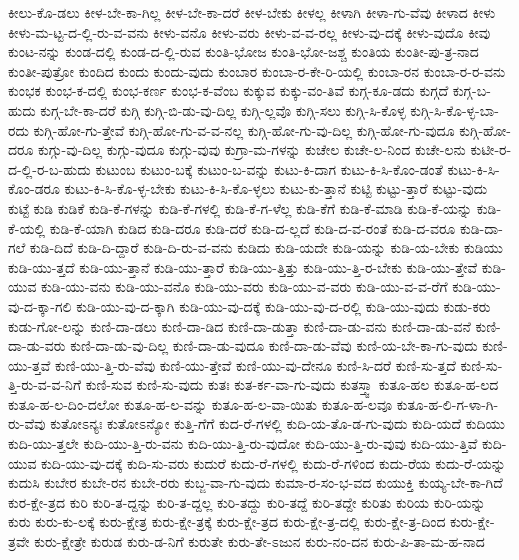 {ಕೀಲು-ಕೊ-ಡಲು
ಕೀಳ-ಬೇ-ಕಾ-ಗಿಲ್ಲ
ಕೀಳ-ಬೇ-ಕಾ-ದರೆ
ಕೀಳ-ಬೇಕು
ಕೀಳಲ್ಲ
ಕೀಳಾಗಿ
ಕೀಳಾ-ಗು-ವೆವು
ಕೀಳಾದ
ಕೀಳು
ಕೀಳು-ಮ-ಟ್ಟ-ದ-ಲ್ಲಿ-ರು-ವ-ವನು
ಕೀಳು-ವನೊ
ಕೀಳು-ವರು
ಕೀಳು-ವ-ವ-ರಲ್ಲ
ಕೀಳು-ವು-ದಕ್ಕೆ
ಕೀಳು-ವುದೊ
ಕೀವು
ಕುಂಟ-ನನ್ನು
ಕುಂಡ-ದಲ್ಲಿ
ಕುಂಡ-ದ-ಲ್ಲಿ-ರುವ
ಕುಂತಿ-ಭೋಜ
ಕುಂತಿ-ಭೋ-ಜಶ್ಚ
ಕುಂತಿಯ
ಕುಂತೀ-ಪು-ತ್ರ-ನಾದ
ಕುಂತೀ-ಪುತ್ರೋ
ಕುಂದಿದ
ಕುಂದು
ಕುಂದು-ವುದು
ಕುಂಬಾರ
ಕುಂಬಾ-ರ-ಕೇ-ರಿ-ಯಲ್ಲಿ
ಕುಂಬಾ-ರನ
ಕುಂಬಾ-ರ-ರ-ವನು
ಕುಂಭಕ
ಕುಂಭ-ಕ-ದಲ್ಲಿ
ಕುಂಭ-ಕರ್ಣ
ಕುಂಭ-ಕ-ವೆಂಬ
ಕುಕ್ಕುವ
ಕುಕ್ಕು-ವಂ-ತಿವೆ
ಕುಗ್ಗ-ಕೂ-ಡದು
ಕುಗ್ಗದೆ
ಕುಗ್ಗ-ಬ-ಹುದು
ಕುಗ್ಗ-ಬೇ-ಕಾ-ದರೆ
ಕುಗ್ಗಿ
ಕುಗ್ಗಿ-ಬಿ-ಡು-ವು-ದಿಲ್ಲ
ಕುಗ್ಗಿ-ಲ್ಲವೊ
ಕುಗ್ಗಿ-ಸಲು
ಕುಗ್ಗಿ-ಸಿ-ಕೊಳ್ಳ
ಕುಗ್ಗಿ-ಸಿ-ಕೊ-ಳ್ಳ-ಬಾ-ರದು
ಕುಗ್ಗಿ-ಹೋ-ಗು-ತ್ತೇವೆ
ಕುಗ್ಗಿ-ಹೋ-ಗು-ವ-ವ-ನಲ್ಲ
ಕುಗ್ಗಿ-ಹೋ-ಗು-ವು-ದಿಲ್ಲ
ಕುಗ್ಗಿ-ಹೋ-ಗು-ವುದೂ
ಕುಗ್ಗಿ-ಹೋ-ದರೂ
ಕುಗ್ಗು-ವು-ದಿಲ್ಲ
ಕುಗ್ಗು-ವುದೂ
ಕುಗ್ಗು-ವುವು
ಕುಗ್ರಾ-ಮ-ಗಳನ್ನು
ಕುಚೇಲ
ಕುಚೇ-ಲ-ನಿಂದ
ಕುಚೇ-ಲನು
ಕುಟೀ-ರ-ದ-ಲ್ಲಿ-ರ-ಬ-ಹುದು
ಕುಟುಂಬ
ಕುಟುಂ-ಬಕ್ಕೆ
ಕುಟುಂ-ಬ-ವನ್ನು
ಕುಟು-ಕಿ-ದಾಗ
ಕುಟು-ಕಿ-ಸಿ-ಕೊಂ-ಡಂತೆ
ಕುಟು-ಕಿ-ಸಿ-ಕೊಂ-ಡರೂ
ಕುಟು-ಕಿ-ಸಿ-ಕೊ-ಳ್ಳ-ಬೇಕು
ಕುಟು-ಕಿ-ಸಿ-ಕೊ-ಳ್ಳಲು
ಕುಟು-ಕು-ತ್ತಾನೆ
ಕುಟ್ಟಿ
ಕುಟ್ಟು-ತ್ತಾರೆ
ಕುಟ್ಟು-ವುದು
ಕುಟ್ಟೆ
ಕುಡಿ
ಕುಡಿಕೆ
ಕುಡಿ-ಕೆ-ಗಳನ್ನು
ಕುಡಿ-ಕೆ-ಗಳಲ್ಲಿ
ಕುಡಿ-ಕೆ-ಗ-ಳೆಲ್ಲ
ಕುಡಿ-ಕೆಗೆ
ಕುಡಿ-ಕೆ-ಮಾಡಿ
ಕುಡಿ-ಕೆ-ಯನ್ನು
ಕುಡಿ-ಕೆ-ಯಲ್ಲಿ
ಕುಡಿ-ಕೆ-ಯಾಗಿ
ಕುಡಿದ
ಕುಡಿ-ದರೂ
ಕುಡಿ-ದರೆ
ಕುಡಿ-ದ-ಲ್ಲದೆ
ಕುಡಿ-ದ-ವ-ರಂತೆ
ಕುಡಿ-ದ-ವರೂ
ಕುಡಿ-ದಾ-ಗಲೆ
ಕುಡಿ-ದಿದೆ
ಕುಡಿ-ದಿ-ದ್ದಾರೆ
ಕುಡಿ-ದಿ-ರು-ವ-ವನು
ಕುಡಿದು
ಕುಡಿ-ಯದೇ
ಕುಡಿ-ಯನ್ನು
ಕುಡಿ-ಯ-ಬೇಕು
ಕುಡಿಯು
ಕುಡಿ-ಯು-ತ್ತದೆ
ಕುಡಿ-ಯು-ತ್ತಾನೆ
ಕುಡಿ-ಯು-ತ್ತಾರೆ
ಕುಡಿ-ಯು-ತ್ತಿತ್ತು
ಕುಡಿ-ಯು-ತ್ತಿ-ರ-ಬೇಕು
ಕುಡಿ-ಯು-ತ್ತೇವೆ
ಕುಡಿ-ಯುವ
ಕುಡಿ-ಯು-ವನು
ಕುಡಿ-ಯು-ವನೊ
ಕುಡಿ-ಯು-ವರು
ಕುಡಿ-ಯು-ವ-ವರು
ಕುಡಿ-ಯು-ವ-ವ-ರೆಗೆ
ಕುಡಿ-ಯು-ವು-ದ-ಕ್ಕಾ-ಗಲಿ
ಕುಡಿ-ಯು-ವು-ದ-ಕ್ಕಾಗಿ
ಕುಡಿ-ಯು-ವು-ದಕ್ಕೆ
ಕುಡಿ-ಯು-ವು-ದ-ರಲ್ಲಿ
ಕುಡಿ-ಯು-ವುದು
ಕುಡು-ಕರು
ಕುಡು-ಗೋ-ಲನ್ನು
ಕುಣಿ-ದಾ-ಡಲು
ಕುಣಿ-ದಾ-ಡಿದ
ಕುಣಿ-ದಾ-ಡುತ್ತಾ
ಕುಣಿ-ದಾ-ಡು-ವನು
ಕುಣಿ-ದಾ-ಡು-ವನೆ
ಕುಣಿ-ದಾ-ಡು-ವರು
ಕುಣಿ-ದಾ-ಡು-ವು-ದಿಲ್ಲ
ಕುಣಿ-ದಾ-ಡು-ವುದೂ
ಕುಣಿ-ದಾ-ಡು-ವೆವು
ಕುಣಿ-ಯ-ಬೇ-ಕಾ-ಗು-ವುದು
ಕುಣಿ-ಯು-ತ್ತವೆ
ಕುಣಿ-ಯು-ತ್ತಿ-ರು-ವೆವು
ಕುಣಿ-ಯು-ತ್ತೇವೆ
ಕುಣಿ-ಯು-ವು-ದೇನೂ
ಕುಣಿ-ಸಿ-ದರೆ
ಕುಣಿ-ಸು-ತ್ತದೆ
ಕುಣಿ-ಸು-ತ್ತಿ-ರು-ವ-ವ-ನಿಗೆ
ಕುಣಿ-ಸುವ
ಕುಣಿ-ಸು-ವುದು
ಕುತಃ
ಕುತ-ರ್ಕ-ವಾ-ಗು-ವುದು
ಕುತಸ್ತ್ವಾ
ಕುತೂ-ಹಲ
ಕುತೂ-ಹ-ಲದ
ಕುತೂ-ಹ-ಲ-ದಿಂ-ದಲೋ
ಕುತೂ-ಹ-ಲ-ವನ್ನು
ಕುತೂ-ಹ-ಲ-ವಾ-ಯಿತು
ಕುತೂ-ಹ-ಲವೂ
ಕುತೂ-ಹ-ಲಿ-ಗ-ಳಾ-ಗಿ-ರು-ವೆವು
ಕುತೋಽನ್ಯಃ
ಕುತೋಽನ್ಯೋ
ಕುತ್ತಿ-ಗೆಗೆ
ಕುದ-ರೆ-ಗಳಲ್ಲಿ
ಕುದಿ-ಯ-ತೊ-ಡ-ಗು-ವುದು
ಕುದಿ-ಯದೆ
ಕುದಿಯು
ಕುದಿ-ಯು-ತ್ತಲೇ
ಕುದಿ-ಯು-ತ್ತಿ-ರು-ವನು
ಕುದಿ-ಯು-ತ್ತಿ-ರು-ವುದೋ
ಕುದಿ-ಯು-ತ್ತಿ-ರು-ವುವು
ಕುದಿ-ಯು-ತ್ತಿವೆ
ಕುದಿ-ಯುವ
ಕುದಿ-ಯು-ವು-ದಕ್ಕೆ
ಕುದಿ-ಸು-ವರು
ಕುದುರೆ
ಕುದು-ರೆ-ಗಳಲ್ಲಿ
ಕುದು-ರೆ-ಗಳಿಂದ
ಕುದು-ರೆಯ
ಕುದು-ರೆ-ಯನ್ನು
ಕುದುಸಿ
ಕುಬೇರ
ಕುಬೇ-ರನ
ಕುಬೇ-ರರು
ಕುಬ್ಜ-ವಾ-ಗು-ವುದು
ಕುಮಾ-ರ-ಸಂ-ಭ-ವದ
ಕುಯುಕ್ತಿ
ಕುಯ್ಯ-ಬೇ-ಕಾ-ಗಿದೆ
ಕುರ-ಕ್ಷೇ-ತ್ರದ
ಕುರಿ
ಕುರಿ-ತ-ದ್ದನ್ನು
ಕುರಿ-ತ-ದ್ದಲ್ಲ
ಕುರಿ-ತದ್ದು
ಕುರಿ-ತದ್ದೆ
ಕುರಿ-ತದ್ದೇ
ಕುರಿತು
ಕುರಿಯ
ಕುರಿ-ಯನ್ನು
ಕುರು
ಕುರು-ಕು-ಲಕ್ಕೆ
ಕುರು-ಕ್ಷೇತ್ರ
ಕುರು-ಕ್ಷೇ-ತ್ರಕ್ಕೆ
ಕುರು-ಕ್ಷೇ-ತ್ರದ
ಕುರು-ಕ್ಷೇ-ತ್ರ-ದಲ್ಲಿ
ಕುರು-ಕ್ಷೇ-ತ್ರ-ದಿಂದ
ಕುರು-ಕ್ಷೇ-ತ್ರವೇ
ಕುರು-ಕ್ಷೇತ್ರೇ
ಕುರುಡ
ಕುರು-ಡ-ನಿಗೆ
ಕುರುತೇ
ಕುರು-ತೇ-ಽಜುನ
ಕುರು-ನಂ-ದನ
ಕುರು-ಪಿ-ತಾ-ಮ-ಹ-ನಾದ
}
